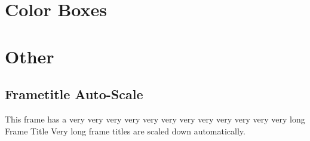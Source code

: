 \documentclass[aspectratio=169]{beamer} %
\begin{document}
    \section{Color Boxes}

    \begin{frame}{\insertsubsection}



    \end{frame}

    \section{Other}

    \subsection{Frametitle Auto-Scale}

    \begin{frame}{This frame has a very very very very very very very very very very very very long Frame Title}
        Very long frame titles are scaled down automatically.
    \end{frame}
\end{document}
